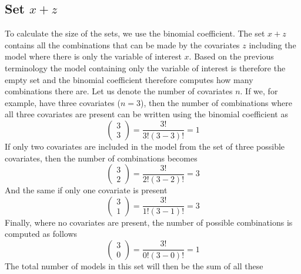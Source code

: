 \subsection{Set $x + z$}
To calculate the size of the sets, we use the binomial coefficient. The set $x + z$ contains all the combinations that can be made by the covariates $z$ including the model where there is only the variable of interest $x$. Based on the previous terminology the model containing only the variable of interest is therefore the empty set and the binomial coefficient therefore computes how many combinations there are. Let us denote the number of covariates $n$. If we, for example, have three covariates ($n=3$), then the number of combinations where all three covariates are present can be written using the binomial coefficient as
\[\left( \begin{array}{c}
3 \\ 
3 \end{array}
\right)=\frac{3!}{3!\left(3-3\right)!}=1\]
If only two covariates are included in the model from the set of three possible covariates, then the number of combinations becomes 
\[\left( \begin{array}{c}
3 \\ 
2 \end{array}
\right)=\frac{3!}{2!\left(3-2\right)!}=3\] 
And the same if only one covariate is present
\[\left( \begin{array}{c}
3 \\ 
1 \end{array}
\right)=\frac{3!}{1!\left(3-1\right)!}=3\] 
Finally, where no covariates are present, the number of possible combinations is computed as follows
\[\left( \begin{array}{c}
3 \\ 
0 \end{array}
\right)=\frac{3!}{0!\left(3-0\right)!}=1\] 
The total number of models in this set will then be the sum of all these



